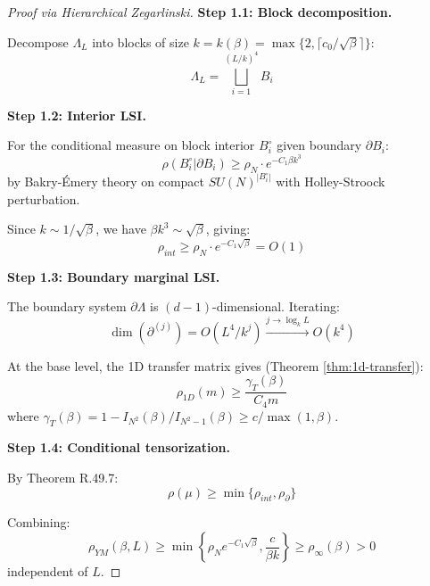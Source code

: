 \begin{proof}[Proof via Hierarchical Zegarlinski]
\textbf{Step 1.1: Block decomposition.}

Decompose $\Lambda_L$ into blocks of size $k = k(\beta) = \max\{2, \lceil c_0/\sqrt{\beta}\rceil\}$:
\begin{equation}
\Lambda_L = \bigsqcup_{i=1}^{(L/k)^4} B_i
\end{equation}

\textbf{Step 1.2: Interior LSI.}

For the conditional measure on block interior $B_i^\circ$ given boundary $\partial B_i$:
\begin{equation}
\rho(B_i^\circ | \partial B_i) \geq \rho_N \cdot e^{-C_1 \beta k^3}
\end{equation}
by Bakry-Émery theory on compact $SU(N)^{|B_i^\circ|}$ with Holley-Stroock perturbation.

Since $k \sim 1/\sqrt{\beta}$, we have $\beta k^3 \sim \sqrt{\beta}$, giving:
\begin{equation}
\rho_{int} \geq \rho_N \cdot e^{-C_1 \sqrt{\beta}} = O(1)
\end{equation}

\textbf{Step 1.3: Boundary marginal LSI.}

The boundary system $\partial \Lambda$ is $(d-1)$-dimensional. Iterating:
\begin{equation}
\dim(\partial^{(j)}) = O(L^4 / k^j) \xrightarrow{j \to \log_k L} O(k^4)
\end{equation}

At the base level, the 1D transfer matrix gives (Theorem \ref{thm:1d-transfer}):
\begin{equation}
\rho_{1D}(m) \geq \frac{\gamma_T(\beta)}{C_4 m}
\end{equation}
where $\gamma_T(\beta) = 1 - I_{N^2}(\beta)/I_{N^2-1}(\beta) \geq c/\max(1,\beta)$.

\textbf{Step 1.4: Conditional tensorization.}

By Theorem R.49.7:
\begin{equation}
\rho(\mu) \geq \min\{\rho_{int}, \rho_{\partial}\}
\end{equation}

Combining:
\begin{equation}
\rho_{YM}(\beta, L) \geq \min\left\{ \rho_N e^{-C_1\sqrt{\beta}}, \frac{c}{\beta k} \right\} \geq \rho_\infty(\beta) > 0
\end{equation}
independent of $L$.
\end{proof}

